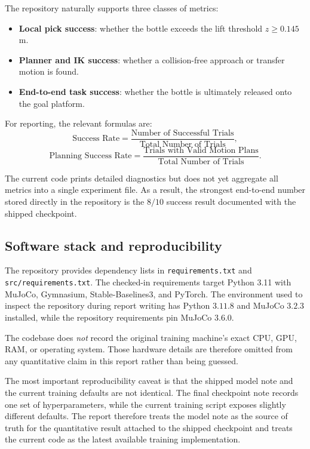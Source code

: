 \documentclass[11pt]{article}
\begin{document}
The repository naturally supports three classes of metrics:
\begin{itemize}[leftmargin=*]
    \item \textbf{Local pick success}: whether the bottle exceeds the lift threshold \(z \geq 0.145\) m.
    \item \textbf{Planner and IK success}: whether a collision-free approach or transfer motion is found.
    \item \textbf{End-to-end task success}: whether the bottle is ultimately released onto the goal platform.
\end{itemize}

For reporting, the relevant formulas are:
\[
\text{Success Rate} =
\frac{\text{Number of Successful Trials}}{\text{Total Number of Trials}},
\]
\[
\text{Planning Success Rate} =
\frac{\text{Trials with Valid Motion Plans}}{\text{Total Number of Trials}}.
\]

The current code prints detailed diagnostics but does not yet aggregate all metrics into a single experiment file. As a result, the strongest end-to-end number stored directly in the repository is the \(8/10\) success result documented with the shipped checkpoint.

\subsection{Software stack and reproducibility}

The repository provides dependency lists in \texttt{requirements.txt} and \texttt{src/requirements.txt}. The checked-in requirements target Python 3.11 with MuJoCo, Gymnasium, Stable-Baselines3, and PyTorch. The environment used to inspect the repository during report writing has Python \(3.11.8\) and MuJoCo \(3.2.3\) installed, while the repository requirements pin MuJoCo \(3.6.0\).

The codebase does \emph{not} record the original training machine's exact CPU, GPU, RAM, or operating system. Those hardware details are therefore omitted from any quantitative claim in this report rather than being guessed.

The most important reproducibility caveat is that the shipped model note and the current training defaults are not identical. The final checkpoint note records one set of hyperparameters, while the current training script exposes slightly different defaults. The report therefore treats the model note as the source of truth for the quantitative result attached to the shipped checkpoint and treats the current code as the latest available training implementation.
\end{document}

